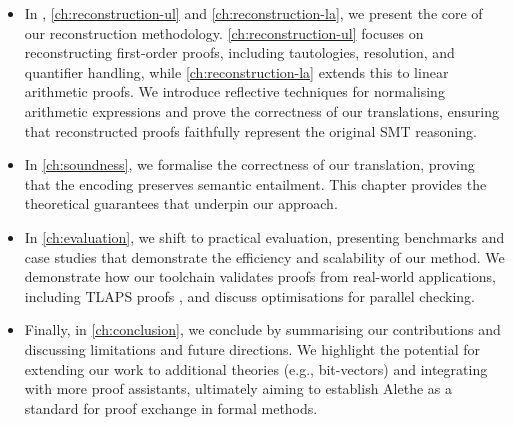 \begin{itemize}
\item In , \ref{ch:reconstruction-ul} and \ref{ch:reconstruction-la}, we present the core of our reconstruction methodology.
    \cref{ch:reconstruction-ul} focuses on reconstructing first-order proofs, including tautologies, resolution, and quantifier handling, while \cref{ch:reconstruction-la} extends this to linear arithmetic proofs.
    We introduce reflective techniques for normalising arithmetic expressions and prove the correctness of our translations, ensuring that reconstructed proofs faithfully represent the original SMT reasoning.

\item In \cref{ch:soundness}, we formalise the correctness of our translation, proving that the encoding preserves semantic entailment.
    This chapter provides the theoretical guarantees that underpin our approach.

\item In \cref{ch:evaluation}, we shift to practical evaluation, presenting benchmarks and case studies that demonstrate the efficiency and scalability of our method.
    We demonstrate how our toolchain validates proofs from real-world applications, including TLAPS proofs \cite{tla-proofs}, and discuss optimisations for parallel checking.

\item Finally, in \cref{ch:conclusion}, we conclude by summarising our contributions and discussing limitations and future directions.
    We highlight the potential for extending our work to additional theories (e.g., bit-vectors) and integrating with more proof assistants, ultimately aiming to establish Alethe as a standard for proof exchange in formal methods.
\end{itemize}
